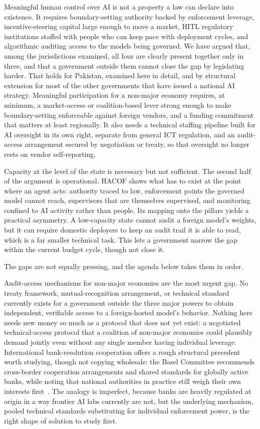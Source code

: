 \documentclass[journal]{IEEEtran}
\newcommand{\hacof}{HACOF}
\begin{document}
Meaningful human control over AI is not a property a law can declare into existence. It requires boundary-setting authority backed by enforcement leverage, incentive-steering capital large enough to move a market, HITL regulatory institutions staffed with people who can keep pace with deployment cycles, and algorithmic auditing access to the models being governed. We have argued that, among the jurisdictions examined, all four are clearly present together only in three, and that a government outside them cannot close the gap by legislating harder. That holds for Pakistan, examined here in detail, and by structural extension for most of the other governments that have issued a national AI strategy. Meaningful participation for a non-major economy requires, at minimum, a market-access or coalition-based lever strong enough to make boundary-setting enforceable against foreign vendors, and a funding commitment that matters at least regionally. It also needs a technical staffing pipeline built for AI oversight in its own right, separate from general ICT regulation, and an audit-access arrangement secured by negotiation or treaty, so that oversight no longer rests on vendor self-reporting.

Capacity at the level of the state is necessary but not sufficient. The second half of the argument is operational. \hacof{} shows what has to exist at the point where an agent acts: authority traced to law, enforcement points the governed model cannot reach, supervisors that are themselves supervised, and monitoring confined to AI activity rather than people. Its mapping onto the pillars yields a practical asymmetry. A low-capacity state cannot audit a foreign model's weights, but it can require domestic deployers to keep an audit trail it is able to read, which is a far smaller technical task. This lets a government narrow the gap within the current budget cycle, though not close it.

The gaps are not equally pressing, and the agenda below takes them in order.

Audit-access mechanisms for non-major economies are the most urgent gap. No treaty framework, mutual-recognition arrangement, or technical standard currently exists for a government outside the three major powers to obtain independent, verifiable access to a foreign-hosted model's behavior. Nothing here needs new money so much as a protocol that does not yet exist: a negotiated technical-access protocol that a coalition of non-major economies could plausibly demand jointly even without any single member having individual leverage. International bank-resolution cooperation offers a rough structural precedent worth studying, though not copying wholesale: the Basel Committee recommends cross-border cooperation arrangements and shared standards for globally active banks, while noting that national authorities in practice still weigh their own interests first~\cite{baselcommittee2010crossborder}.
The analogy is imperfect, because banks are heavily regulated at origin in a way frontier AI labs currently are not, but the underlying mechanism, pooled technical standards substituting for individual enforcement power, is the right shape of solution to study first.
\end{document}
